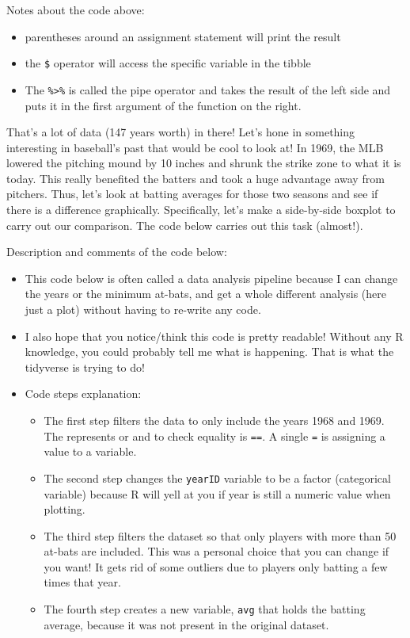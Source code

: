 \documentclass[
]{article}
\providecommand{\tightlist}{%
  \setlength{\itemsep}{0pt}\setlength{\parskip}{0pt}}
\begin{document}
Notes about the code above:

\begin{itemize}
\tightlist
\item
  parentheses around an assignment statement will print the result
\item
  the \texttt{\$} operator will access the specific variable in the
  tibble
\item
  The \texttt{\%\textgreater{}\%} is called the pipe operator and takes
  the result of the left side and puts it in the first argument of the
  function on the right.
\end{itemize}

That's a lot of data (147 years worth) in there! Let's hone in something
interesting in baseball's past that would be cool to look at! In 1969,
the MLB lowered the pitching mound by 10 inches and shrunk the strike
zone to what it is today. This really benefited the batters and took a
huge advantage away from pitchers. Thus, let's look at batting averages
for those two seasons and see if there is a difference graphically.
Specifically, let's make a side-by-side boxplot to carry out our
comparison. The code below carries out this task (almost!).

Description and comments of the code below:

\begin{itemize}
\tightlist
\item
  This code below is often called a data analysis pipeline because I can
  change the years or the minimum at-bats, and get a whole different
  analysis (here just a plot) without having to re-write any code.
\item
  I also hope that you notice/think this code is pretty readable!
  Without any R knowledge, you could probably tell me what is happening.
  That is what the tidyverse is trying to do!
\item
  Code steps explanation:

  \begin{itemize}
  \tightlist
  \item
    The first step filters the data to only include the years 1968 and
    1969. The \texttt{\textbar{}} represents or and to check equality is
    \texttt{==}. A single \texttt{=} is assigning a value to a variable.
  \item
    The second step changes the \texttt{yearID} variable to be a factor
    (categorical variable) because R will yell at you if year is still a
    numeric value when plotting.
  \item
    The third step filters the dataset so that only players with more
    than 50 at-bats are included. This was a personal choice that you
    can change if you want! It gets rid of some outliers due to players
    only batting a few times that year.
  \item
    The fourth step creates a new variable, \texttt{avg} that holds the
    batting average, because it was not present in the original dataset.
  \end{itemize}
\end{itemize}
\end{document}
